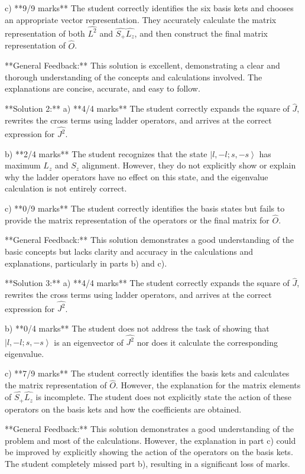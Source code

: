 \documentclass[a4paper,11pt]{article}
\begin{document}
c) **9/9 marks**
The student correctly identifies the six basis kets and chooses an appropriate vector representation. They accurately calculate the matrix representation of both \(\hat{L^2}\) and \(\hat{S_+}\hat{L_z}\), and then construct the final matrix representation of \(\hat{O}\).

**General Feedback:** This solution is excellent, demonstrating a clear and thorough understanding of the concepts and calculations involved. The explanations are concise, accurate, and easy to follow.

**Solution 2:**
a) **4/4 marks**
The student correctly expands the square of \(\hat{J}\), rewrites the cross terms using ladder operators, and arrives at the correct expression for \(\hat{J^2}\).

b) **2/4 marks**
The student recognizes that the state \(\left|l, -l; s, -s \right>\) has maximum \(L_z\) and \(S_z\) alignment. However, they do not explicitly show or explain why the ladder operators have no effect on this state, and the eigenvalue calculation is not entirely correct.

c) **0/9 marks**
The student correctly identifies the basis states but fails to provide the matrix representation of the operators or the final matrix for \(\hat{O}\).

**General Feedback:** This solution demonstrates a good understanding of the basic concepts but lacks clarity and accuracy in the calculations and explanations, particularly in parts b) and c).

**Solution 3:**
a) **4/4 marks**
The student correctly expands the square of \(\hat{J}\), rewrites the cross terms using ladder operators, and arrives at the correct expression for \(\hat{J^2}\).

b) **0/4 marks**
The student does not address the task of showing that \(\left|l, -l; s, -s \right>\) is an eigenvector of \(\hat{J^2}\) nor does it calculate the corresponding eigenvalue.

c) **7/9 marks**
The student correctly identifies the basis kets and calculates the matrix representation of \(\hat{O}\). However, the explanation for the matrix elements of \(\hat{S_+}\hat{L_z}\) is incomplete. The student does not explicitly state the action of these operators on the basis kets and how the coefficients are obtained.

**General Feedback:** This solution demonstrates a good understanding of the problem and most of the calculations. However, the explanation in part c) could be improved by explicitly showing the action of the operators on the basis kets. The student completely missed part b), resulting in a significant loss of marks.
\end{document}
